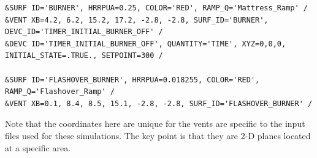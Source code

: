\documentclass[12pt,oneside]{book}
\begin{document}

\begin{lstlisting}
&SURF ID='BURNER', HRRPUA=0.25, COLOR='RED', RAMP_Q='Mattress_Ramp' /
&VENT XB=4.2, 6.2, 15.2, 17.2, -2.8, -2.8, SURF_ID='BURNER', DEVC_ID='TIMER_INITIAL_BURNER_OFF' /
&DEVC ID='TIMER_INITIAL_BURNER_OFF', QUANTITY='TIME', XYZ=0,0,0, INITIAL_STATE=.TRUE., SETPOINT=300 /

&SURF ID='FLASHOVER_BURNER', HRRPUA=0.018255, COLOR='RED', RAMP_Q='Flashover_Ramp' /
&VENT XB=0.1, 8.4, 8.5, 15.1, -2.8, -2.8, SURF_ID='FLASHOVER_BURNER' /
\end{lstlisting}
Note that the coordinates here are unique for the vents are specific to the input files used for these simulations. The key point is that they are 2-D planes located at a specific area.
\end{document}
